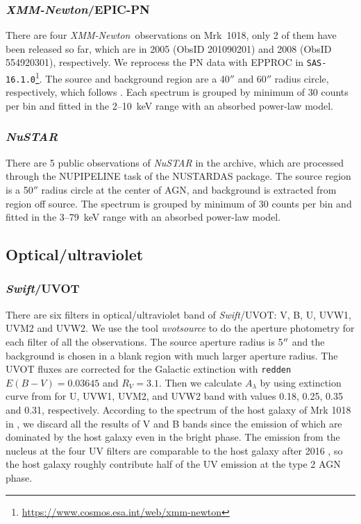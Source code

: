 \documentclass[twocolumn]{aastex63}
\newcommand{\xmm}{{\em XMM-Newton}}
\newcommand{\nustar}{{\em NuSTAR }}
\newcommand{\uvot}{{\small {\it Swift}/UVOT}}
\begin{document}
\subsubsection{\xmm/EPIC-PN}
There are four \xmm \, observations on Mrk~1018, only 2 of them have been released so far, which are in 2005 (ObsID 201090201) and 2008 (ObsID 554920301), respectively. We reprocess the PN data with {\scriptsize EPPROC} in \texttt{SAS-16.1.0}\footnote{\url{https://www.cosmos.esa.int/web/xmm-newton}}. The source and background region are a 40$''$ and 60$''$ radius circle, respectively, which follows \citet{2018MNRAS.480.3898N}. Each spectrum is grouped by minimum of 30 counts per bin and fitted in the 2--10~keV range with an absorbed power-law model. 



\subsubsection{\nustar}
There are 5 public observations of \nustar in the archive, which are processed through the {\scriptsize NUPIPELINE} task of the {\scriptsize NUSTARDAS} package. The source region is a 50$''$ radius circle at the center of AGN, and background is extracted from region off source. The spectrum is grouped by minimum of 30 counts per bin and fitted in the 3--79~keV range with an absorbed power-law model.


\subsection{Optical/ultraviolet}
\subsubsection{\uvot}
\label{sec:uvot}
There are six filters in optical/ultraviolet band of \uvot: V, B, U, UVW1, UVM2 and UVW2. We use the tool \textit{uvotsource} to do the aperture photometry for each filter of all the observations. The source aperture radius is 5$\mbox{$^{\prime\prime}$}$ and the background is chosen in a blank region with much larger aperture radius. The UVOT fluxes are corrected for the Galactic extinction with \texttt{redden} $E(B-V) = 0.03645$ \citep[see ][]{2018MNRAS.480.3898N} and $R_{V}=3.1$. Then we calculate  $A_{\lambda}$ by using extinction curve from \citet{2007ApJ...663..320F} for U, UVW1, UVM2, and 
UVW2 band with values 0.18, 0.25, 0.35 and 0.31, respectively. According to the spectrum of the host galaxy of Mrk 1018 in \citep{2018MNRAS.480.3898N}, we discard all the results of V and B bands since the emission of which are dominated by the host galaxy even in the bright phase. The emission from the nucleus at the four UV filters are comparable to the host galaxy after 2016 \citep[see][]{2018MNRAS.480.3898N}, so the host galaxy roughly contribute half of the UV emission at the type 2 AGN phase. 
\end{document}
